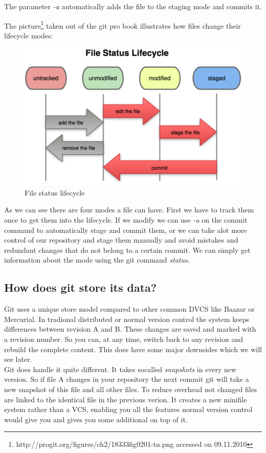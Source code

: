 The parameter \emph{-a} automatically adds the file to the staging mode and
commits it. \cite[Chapter 2.2]{gitpro2009}

The picture\footnote{http://progit.org/figures/ch2/18333fig0201-tn.png accessed on 
09.11.2010} taken out of the git pro book illustrates how files change their
lifecycle modes:

\begin{figure}[h]
  \centering
  \includegraphics{img/file_status_lifecycle}
  \caption{File status lifecycle}
  \label{fig:File status lifecycle}
  
\end{figure} 

As we can see there are four modes a file can have. First we have to track them
once to get them into the lifecycle. If we modify we can use \emph{-a} on the
commit command to automatically stage and commit them, or we can take alot more
control of our repository and stage them manually and avoid mistakes and
redundant changes that do not belong to a certain commit.
We can simply get information about the mode using the git command
\emph{status}. \cite[Chapter 2.2]{gitpro2009} 

\subsection{How does git store its data?}
Git uses a unique store model compared to other common DVCS like Baazar or Mercurial. 
In tradional distributed or normal version control the system keeps differences between revision A and B. 
These changes are saved and marked with a revision number. 
So you can, at any time, switch back to any revision and rebuild the complete content.
This does have some major downsides which we will see later. \\
Git does handle it quite different. It takes socalled \emph{snapshots} in every
new version. So if file A changes in your repository the next commit git will take a new snapshot of this file and all other files. 
To reduce overhead not changed files are linked to the identical file in the previous verion. 
It creates a new minifile system rather than a VCS, enabling you all the features normal version 
control would give you and gives you some additional on top of it. \cite{gitpro2009} 

